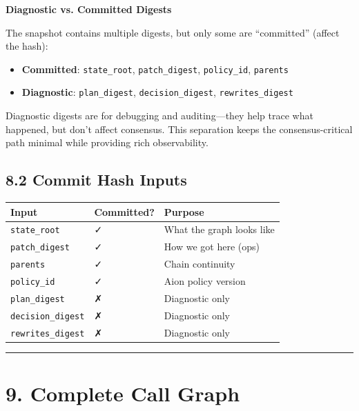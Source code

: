 \documentclass[11pt]{book}
\newcounter{none} %
\begin{document}
\begin{deepdive}
\textbf{Diagnostic vs. Committed Digests}

The snapshot contains multiple digests, but only some are ``committed'' (affect the hash):

\begin{itemize}
\item \textbf{Committed}: \texttt{state\_root}, \texttt{patch\_digest}, \texttt{policy\_id}, \texttt{parents}
\item \textbf{Diagnostic}: \texttt{plan\_digest}, \texttt{decision\_digest}, \texttt{rewrites\_digest}
\end{itemize}

Diagnostic digests are for debugging and auditing---they help trace what happened, but don't affect consensus. This separation keeps the consensus-critical path minimal while providing rich observability.
\end{deepdive}

\subsection{8.2 Commit Hash Inputs}\label{commit-hash-inputs}

{\def\LTcaptype{none} %
\begin{longtable}[]{@{}lll@{}}
\toprule\noalign{}
Input & Committed? & Purpose \\
\midrule\noalign{}
\endhead
\bottomrule\noalign{}
\endlastfoot
\texttt{state\_root} & ✓ & What the graph looks like \\
\texttt{patch\_digest} & ✓ & How we got here (ops) \\
\texttt{parents} & ✓ & Chain continuity \\
\texttt{policy\_id} & ✓ & Aion policy version \\
\texttt{plan\_digest} & ✗ & Diagnostic only \\
\texttt{decision\_digest} & ✗ & Diagnostic only \\
\texttt{rewrites\_digest} & ✗ & Diagnostic only \\
\end{longtable}
}

\begin{center}\rule{0.5\linewidth}{0.5pt}\end{center}

\section{9. Complete Call Graph}\label{complete-call-graph}
\end{document}
